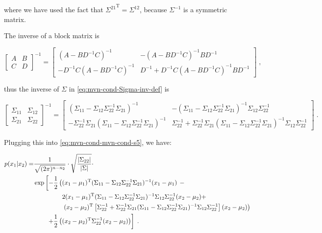 \documentclass[a4paper,12pt,twoside]{book}
\begin{document}
where we have used the fact that ${\Sigma^{21}}^\mathrm{T} = \Sigma^{12}$, because $\Sigma^{-1}$ is a symmetric matrix.

\vspace{1em}
The inverse of a block matrix is

\begin{equation} \label{eq:mvn-cond-Block-inv}
\begin{bmatrix} A & B \\ C & D \end{bmatrix}^{-1} = \begin{bmatrix} (A-BD^{-1}C)^{-1} & -(A-BD^{-1}C)^{-1}BD^{-1} \\ -D^{-1}C(A-BD^{-1}C)^{-1} & D^{-1}+D^{-1}C(A-BD^{-1}C)^{-1}BD^{-1} \end{bmatrix} \; ,
\end{equation}

thus the inverse of $\Sigma$ in \eqref{eq:mvn-cond-Sigma-inv-def} is

\begin{equation} \label{eq:mvn-cond-Sigma-inv}
\begin{bmatrix} \Sigma_{11} & \Sigma_{12} \\ \Sigma_{21} & \Sigma_{22} \end{bmatrix}^{-1} = \begin{bmatrix} (\Sigma_{11} - \Sigma_{12} \Sigma_{22}^{-1} \Sigma_{21})^{-1} & -(\Sigma_{11} - \Sigma_{12} \Sigma_{22}^{-1} \Sigma_{21})^{-1} \Sigma_{12} \Sigma_{22}^{-1} \\ -\Sigma_{22}^{-1} \Sigma_{21} (\Sigma_{11} - \Sigma_{12} \Sigma_{22}^{-1} \Sigma_{21})^{-1} & \Sigma_{22}^{-1} + \Sigma_{22}^{-1} \Sigma_{21} (\Sigma_{11} - \Sigma_{12} \Sigma_{22}^{-1} \Sigma_{21})^{-1} \Sigma_{12} \Sigma_{22}^{-1} \end{bmatrix} \; .
\end{equation}

Plugging this into \eqref{eq:mvn-cond-mvn-cond-s5}, we have:

\begin{equation} \label{eq:mvn-cond-mvn-cond-s6}
\begin{split}
p(x_1|x_2) = &\frac{1}{\sqrt{(2 \pi)^{n-n_2}}} \cdot \sqrt{\frac{|\Sigma_{22}|}{|\Sigma|}} \cdot \\
&\exp \left[ -\frac{1}{2} \left( (x_1-\mu_1)^\mathrm{T} (\Sigma_{11} - \Sigma_{12} \Sigma_{22}^{-1} \Sigma_{21})^{-1} (x_1-\mu_1) \right. \right. - \\
&\hphantom{\exp \left[ -\frac{1}{2} \left( \right. \right.} 2 (x_1-\mu_1)^\mathrm{T} (\Sigma_{11} - \Sigma_{12} \Sigma_{22}^{-1} \Sigma_{21})^{-1} \Sigma_{12} \Sigma_{22}^{-1} (x_2-\mu_2) + \\
&\hphantom{\exp \left[ -\frac{1}{2} \left( \right. \right.} \left. (x_2-\mu_2)^\mathrm{T} \left[ \Sigma_{22}^{-1} + \Sigma_{22}^{-1} \Sigma_{21} (\Sigma_{11} - \Sigma_{12} \Sigma_{22}^{-1} \Sigma_{21})^{-1} \Sigma_{12} \Sigma_{22}^{-1} \right] (x_2-\mu_2) \right) \\
&\hphantom{\exp \left[\right.} \left. + \frac{1}{2} \left( (x_2-\mu_2)^\mathrm{T} \Sigma_{22}^{-1} (x_2-\mu_2) \right) \right] \; .
\end{split}
\end{equation}
\end{document}
